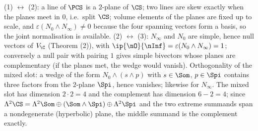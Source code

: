 (1) $\leftrightarrow$ (2): a line of $\PCS$ is a $2$-plane of $\CS$; two lines are skew exactly when the planes meet in $0$, i.e.\ split $\CS$; volume elements of the planes are fixed up to scale, and $\varepsilon(N_0\wedge N_\infty) \neq 0$ because the four spanning vectors form a basis, so the joint normalisation is available. (2) $\leftrightarrow$ (3): $N_\infty$ and $N_0$ are simple, hence null vectors of $V_\C$ (Theorem (2)), with $\ip{\nO}{\nInf} = \varepsilon(N_0\wedge N_\infty) = 1$; conversely a null pair with pairing $1$ gives simple bivectors whose planes are complementary (if the planes met, the wedge would vanish). Orthogonality of the mixed slot: a wedge of the form $N_0 \wedge (s\wedge p)$ with $s \in \Som$, $p \in \Spi$ contains three factors from the $2$-plane $\Spi$, hence vanishes; likewise for $N_\infty$. The mixed slot has dimension $2 \cdot 2 = 4$ and the complement has dimension $6 - 2 = 4$; since $\Lambda^2\CS = \Lambda^2\Som \oplus (\Som\wedge\Spi) \oplus \Lambda^2\Spi$ and the two extreme summands span a nondegenerate (hyperbolic) plane, the middle summand is the complement exactly.
